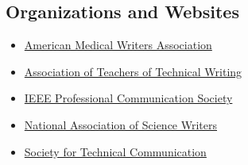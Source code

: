 \documentclass[11pt]{article}
\begin{document}
\subsection{Organizations and Websites}
\begin{itemize}
\item\href{http://www.amwa.org/}{American Medical Writers Association}
\item\href{http://www.attw.org/}{Association of Teachers of Technical Writing}
\item\href{http://www.ieeepcs.org/}{IEEE Professional Communication Society}
\item\href{http://nasw.org/}{National Association of Science Writers}
\item\href{http://www.stc.org/}{Society for Technical Communication}
\end{itemize}
\end{document}
